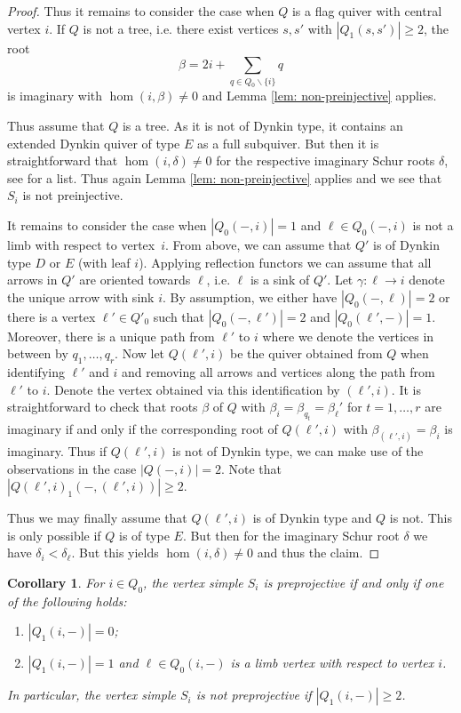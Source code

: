 \documentclass{amsart}
\newtheorem{corollary}[theorem]{Corollary}
\numberwithin{equation}{section}
\begin{document}
\begin{proof}
  Thus it remains to consider the case when $Q$ is a flag quiver with central vertex $i$.
  If $Q$ is not a tree, i.e. there exist vertices $s,s'$ with $|Q_1(s,s')|\geq 2$, the root 
  $$\beta=2i+\sum_{q\in Q_0\backslash\{i\}}q$$
  is imaginary with $\hom(i,\beta)\neq 0$ and Lemma \ref{lem: non-preinjective} applies.
  
  Thus assume that $Q$ is a tree.
  As it is not of Dynkin type, it contains an extended Dynkin quiver of type $E$ as a full subquiver.
  But then it is straightforward that $\hom(i,\delta)\neq 0$ for the respective imaginary Schur roots $\delta$, see \cite[Section 4]{CB} for a list.
  Thus again Lemma \ref{lem: non-preinjective} applies and we see that $S_i$ is not preinjective.
	
  It remains to consider the case when $|Q_0(-,i)|=1$ and $\ell\in Q_0(-,i)$ is not a limb with respect to vertex~$i$.
  From above, we can assume that $Q'$ is of Dynkin type $D$ or $E$ (with leaf $i$).
  Applying reflection functors we can assume that all arrows in $Q'$ are oriented towards $\ell$, i.e. $\ell$ is a sink of $Q'$.
  Let $\gamma:\ell\to i$ denote the unique arrow with sink $i$. 
By assumption, we either have $|Q_0(-,\ell)|=2$ or there is a vertex $\ell'\in Q'_0$ such that $|Q_0(-,\ell')|=2$ and $|Q_0(\ell',-)|=1$.
Moreover, there is a unique path from $\ell'$ to $i$ where we denote the vertices in between by $q_1,\ldots,q_r$.
Now let $Q(\ell',i)$ be the quiver obtained from $Q$ when identifying $\ell'$ and $i$ and removing all arrows and vertices along the path from $\ell'$ to $i$.
Denote the vertex obtained via this identification by $(\ell',i)$.
It is straightforward to check that roots $\beta$ of $Q$ with $\beta_i=\beta_{q_t}=\beta_\ell'$ for $t=1,\ldots,r$ are imaginary if and only if the corresponding root of $Q(\ell',i)$ with $\beta_{(\ell',i)}=\beta_i$ is imaginary.
Thus if $Q(\ell',i)$ is not of Dynkin type, we can make use of the observations in the case $|Q(-,i)|=2$.
Note that $|Q(\ell',i)_1(-,(\ell',i))|\geq 2$.

Thus we may finally assume that $Q(\ell',i)$ is of Dynkin type and $Q$ is not.
This is only possible if $Q$ is of type $E$.
But then for the imaginary Schur root $\delta$ we have $\delta_i<\delta_\ell$.
But this yields $\hom(i,\delta)\neq 0$ and thus the claim.
\end{proof}

\begin{corollary}
  \label{cor:simpleregular}
  For $i\in Q_0$, the vertex simple $S_i$ is preprojective if and only if one of the following holds: 
  \begin{enumerate}
    \item $|Q_1(i,-)|=0$;
    \item $|Q_1(i,-)|=1$ and $\ell\in Q_0(i,-)$ is a limb vertex with respect to vertex $i$. %
  \end{enumerate}
  In particular, the vertex simple $S_i$ is not preprojective if $|Q_1(i,-)|\geq 2$.
\end{corollary}
\end{document}
